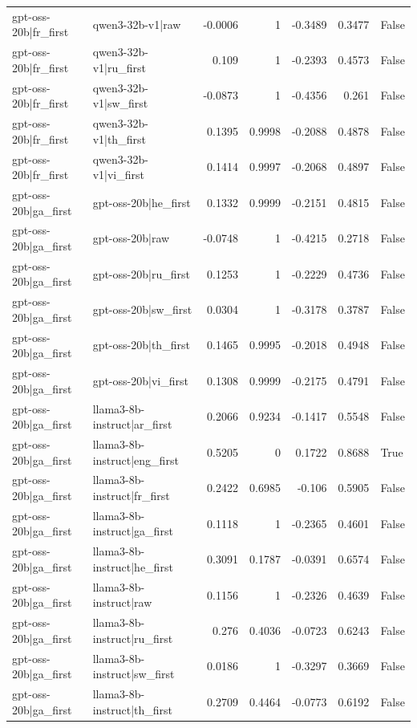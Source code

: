 \begin{table}
\begin{tabular}{l l r r r r l}
gpt-oss-20b|fr_first & qwen3-32b-v1|raw & -0.0006 & 1 & -0.3489 & 0.3477 & False \\
gpt-oss-20b|fr_first & qwen3-32b-v1|ru_first & 0.109 & 1 & -0.2393 & 0.4573 & False \\
gpt-oss-20b|fr_first & qwen3-32b-v1|sw_first & -0.0873 & 1 & -0.4356 & 0.261 & False \\
gpt-oss-20b|fr_first & qwen3-32b-v1|th_first & 0.1395 & 0.9998 & -0.2088 & 0.4878 & False \\
gpt-oss-20b|fr_first & qwen3-32b-v1|vi_first & 0.1414 & 0.9997 & -0.2068 & 0.4897 & False \\
gpt-oss-20b|ga_first & gpt-oss-20b|he_first & 0.1332 & 0.9999 & -0.2151 & 0.4815 & False \\
gpt-oss-20b|ga_first & gpt-oss-20b|raw & -0.0748 & 1 & -0.4215 & 0.2718 & False \\
gpt-oss-20b|ga_first & gpt-oss-20b|ru_first & 0.1253 & 1 & -0.2229 & 0.4736 & False \\
gpt-oss-20b|ga_first & gpt-oss-20b|sw_first & 0.0304 & 1 & -0.3178 & 0.3787 & False \\
gpt-oss-20b|ga_first & gpt-oss-20b|th_first & 0.1465 & 0.9995 & -0.2018 & 0.4948 & False \\
gpt-oss-20b|ga_first & gpt-oss-20b|vi_first & 0.1308 & 0.9999 & -0.2175 & 0.4791 & False \\
gpt-oss-20b|ga_first & llama3-8b-instruct|ar_first & 0.2066 & 0.9234 & -0.1417 & 0.5548 & False \\
gpt-oss-20b|ga_first & llama3-8b-instruct|eng_first & 0.5205 & 0 & 0.1722 & 0.8688 & True \\
gpt-oss-20b|ga_first & llama3-8b-instruct|fr_first & 0.2422 & 0.6985 & -0.106 & 0.5905 & False \\
gpt-oss-20b|ga_first & llama3-8b-instruct|ga_first & 0.1118 & 1 & -0.2365 & 0.4601 & False \\
gpt-oss-20b|ga_first & llama3-8b-instruct|he_first & 0.3091 & 0.1787 & -0.0391 & 0.6574 & False \\
gpt-oss-20b|ga_first & llama3-8b-instruct|raw & 0.1156 & 1 & -0.2326 & 0.4639 & False \\
gpt-oss-20b|ga_first & llama3-8b-instruct|ru_first & 0.276 & 0.4036 & -0.0723 & 0.6243 & False \\
gpt-oss-20b|ga_first & llama3-8b-instruct|sw_first & 0.0186 & 1 & -0.3297 & 0.3669 & False \\
gpt-oss-20b|ga_first & llama3-8b-instruct|th_first & 0.2709 & 0.4464 & -0.0773 & 0.6192 & False \\

\end{tabular}
\end{table}
